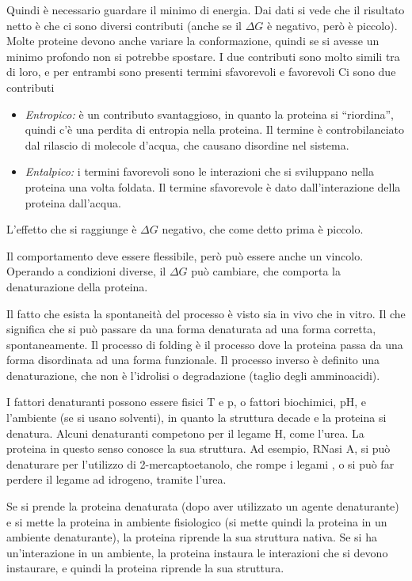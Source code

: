 Quindi è necessario guardare il minimo di energia.
Dai dati si vede che il risultato netto è che ci sono diversi
contributi (anche se il $\Delta G$ è negativo, però è piccolo).
Molte proteine devono anche variare la conformazione, quindi se si
avesse un minimo profondo non si potrebbe spostare.
I due contributi sono molto simili tra di loro, e per entrambi sono
presenti termini sfavorevoli e favorevoli Ci sono due contributi

\begin{itemize}
\item
\emph{Entropico:} è un contributo svantaggioso, in quanto la proteina si
``riordina'', quindi c'è una perdita di entropia nella proteina. Il
termine è controbilanciato dal rilascio di molecole d'acqua, che
causano disordine nel sistema.
\item
\emph{Entalpico:} i termini favorevoli sono le interazioni che si sviluppano
nella proteina una volta foldata. Il termine sfavorevole è dato
dall'interazione della proteina dall'acqua.
\end{itemize}

L'effetto che si raggiunge è $\Delta G$ negativo, che come detto prima è
piccolo.

Il comportamento deve essere flessibile, però può essere anche un
vincolo. Operando a condizioni diverse, il $\Delta G$ può cambiare, che
comporta la denaturazione della proteina.

Il fatto che esista la spontaneità del processo è visto sia in vivo che
in vitro. Il che significa che si può passare da una forma denaturata ad
una forma corretta, spontaneamente. Il processo di folding è il processo
dove la proteina passa da una forma disordinata ad una forma funzionale.
Il processo inverso è definito una denaturazione, che non è l'idrolisi o
degradazione (taglio degli amminoacidi).

I fattori denaturanti possono essere fisici T e p, o fattori biochimici,
pH, e l'ambiente (se si usano solventi), in quanto la struttura decade e
la proteina si denatura.
Alcuni denaturanti competono per il legame H, come l'urea.
La proteina in questo senso conosce la sua struttura.
Ad esempio, RNasi A, si può denaturare per l'utilizzo di
2-mercaptoetanolo, che rompe i legami , o si può far perdere il legame
ad idrogeno, tramite l'urea.

Se si prende la proteina denaturata (dopo aver utilizzato un agente
denaturante) e si mette la proteina in ambiente fisiologico (si mette
quindi la proteina in un ambiente denaturante), la proteina riprende la
sua struttura nativa.
Se si ha un'interazione in un ambiente, la proteina instaura le
interazioni che si devono instaurare, e quindi la proteina riprende la
sua struttura.

